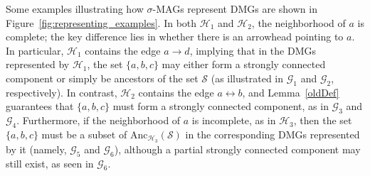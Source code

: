 \documentclass[accepted]{uai2025} %
\newcommand{\anc}{\text{Anc}}
\newcommand{\tuh}{\mathrel{\rightarrow}}
\newcommand{\huh}{\mathrel{\leftrightarrow}}
\begin{document}
Some examples illustrating how $\sigma$-MAGs represent DMGs are shown in Figure~\ref{fig:representing_examples}. In both $\mathcal{H}_1$ and $\mathcal{H}_2$, the neighborhood of \( a \) is complete; the key difference lies in whether there is an arrowhead pointing to \( a \). In particular, $\mathcal{H}_1$ contains the edge \( a \tuh d \), implying that in the DMGs represented by $\mathcal{H}_1$, the set \( \{a,b,c\} \) may either form a strongly connected component or simply be ancestors of the set \( \mathcal{S} \) (as illustrated in $\mathcal{G}_1$ and $\mathcal{G}_2$, respectively). In contrast, $\mathcal{H}_2$ contains the edge \( a \huh b \), and Lemma~\ref{oldDef} guarantees that \( \{a,b,c\} \) must form a strongly connected component, as in $\mathcal{G}_3$ and $\mathcal{G}_4$. Furthermore, if the neighborhood of \( a \) is incomplete, as in \( \mathcal{H}_3 \), then the set \( \{a,b,c\} \) must be a subset of \( \anc_{\mathcal{H}_3}(\mathcal{S}) \) in the corresponding DMGs represented by it (namely, \( \mathcal{G}_5 \) and \( \mathcal{G}_6 \)), although a partial strongly connected component may still exist, as seen in \( \mathcal{G}_6 \).
\end{document}
